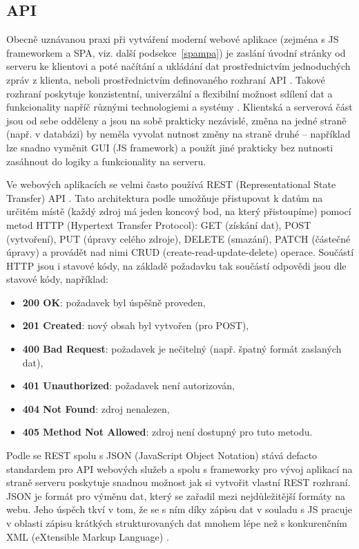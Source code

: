         \subsection{API}\label{api}
        Obecně uznávanou praxi při vytváření moderní webové aplikace (zejména s JS frameworkem a SPA, viz. další podsekce~\ref{spampa}) je zaslání úvodní stránky od serveru ke klientovi a poté načítání a ukládání dat prostřednictvím jednoduchých zpráv z klienta, neboli prostřednictvím definovaného rozhraní API \cite{api1}. 
        Takové rozhraní poskytuje konzistentní, univerzální a flexibilní možnost sdílení dat a funkcionality napříč různými technologiemi a systémy \cite{api2}. Klientská a serverová část jsou od sebe odděleny a jsou na sobě prakticky nezávislé, změna na jedné straně (např. v databázi) by neměla vyvolat nutnost změny na straně druhé \cite{api3} -- například lze snadno vyměnit GUI (JS framework) a použít jiné prakticky bez nutnosti zasáhnout do logiky a funkcionality na serveru.
        
        Ve webových aplikacích se velmi často používá REST (Representational State Transfer) API \cite{api1}. Tato architektura podle \cite{api4} umožňuje přistupovat k datům na určitém místě (každý zdroj má jeden koncový bod, na který přistoupíme) pomocí metod HTTP (Hypertext Transfer Protocol): GET (získání dat), POST (vytvoření), PUT (úpravy celého zdroje), DELETE (smazání), PATCH (částečné úpravy) a provádět nad nimi CRUD (create-read-update-delete) operace. Součástí HTTP jsou i stavové kódy, na základě požadavku tak součástí odpovědi jsou dle \cite{api4} stavové kódy, například:
            \begin{itemize}
                \item \textbf{200 OK}: požadavek byl úspěšně proveden,
                \item \textbf{201 Created}: nový obsah byl vytvořen (pro POST),
                \item \textbf{400 Bad Request}: požadavek je nečitelný (např. špatný formát zaslaných dat),
                \item \textbf{401 Unauthorized}: požadavek není autorizován,
                \item \textbf{404 Not Found}: zdroj nenalezen,
                \item \textbf{405 Method Not Allowed}: zdroj není dostupný pro tuto metodu.
            \end{itemize}
        Podle \cite{api5} se REST spolu s JSON (JavaScript Object Notation) stává defacto standardem pro API webových služeb a spolu s frameworky pro vývoj aplikací na straně serveru poskytuje snadnou možnost jak si vytvořit vlastní REST rozhraní. JSON je formát pro výměnu dat, který se zařadil mezi nejdůležitější formáty na webu. Jeho úspěch tkví v tom, že se s ním díky zápisu dat v souladu s JS pracuje v oblasti zápisu krátkých strukturovaných dat mnohem lépe než s konkurenčním XML (eXtensible Markup Language) \cite{api6}.
        
